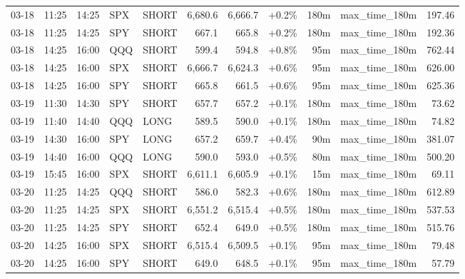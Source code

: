 \documentclass[11pt,a4paper,twoside]{article}
\begin{document}
\begin{center}
\begin{longtable}{>{\color{txtmain}}l l l l l r r r r >{\color{txtmain}}l r}
03-18 & 11:25 & 14:25 & SPX & SHORT & 6,680.6 & 6,666.7 & \textcolor{wingreen}{+0.2\%} & 180m & max\_time\_180m & \textcolor{wingreen}{197.46} \\
03-18 & 11:25 & 14:25 & SPY & SHORT & 667.1 & 665.8 & \textcolor{wingreen}{+0.2\%} & 180m & max\_time\_180m & \textcolor{wingreen}{192.36} \\
03-18 & 14:25 & 16:00 & QQQ & SHORT & 599.4 & 594.8 & \textcolor{wingreen}{+0.8\%} & 95m & max\_time\_180m & \textcolor{wingreen}{762.44} \\
03-18 & 14:25 & 16:00 & SPX & SHORT & 6,666.7 & 6,624.3 & \textcolor{wingreen}{+0.6\%} & 95m & max\_time\_180m & \textcolor{wingreen}{626.00} \\
03-18 & 14:25 & 16:00 & SPY & SHORT & 665.8 & 661.5 & \textcolor{wingreen}{+0.6\%} & 95m & max\_time\_180m & \textcolor{wingreen}{625.36} \\
03-19 & 11:30 & 14:30 & SPY & SHORT & 657.7 & 657.2 & \textcolor{wingreen}{+0.1\%} & 180m & max\_time\_180m & \textcolor{wingreen}{73.62} \\
03-19 & 11:40 & 14:40 & QQQ & LONG & 589.5 & 590.0 & \textcolor{wingreen}{+0.1\%} & 180m & max\_time\_180m & \textcolor{wingreen}{74.82} \\
03-19 & 14:30 & 16:00 & SPY & LONG & 657.2 & 659.7 & \textcolor{wingreen}{+0.4\%} & 90m & max\_time\_180m & \textcolor{wingreen}{381.07} \\
03-19 & 14:40 & 16:00 & QQQ & LONG & 590.0 & 593.0 & \textcolor{wingreen}{+0.5\%} & 80m & max\_time\_180m & \textcolor{wingreen}{500.20} \\
03-19 & 15:45 & 16:00 & SPX & SHORT & 6,611.1 & 6,605.9 & \textcolor{wingreen}{+0.1\%} & 15m & max\_time\_180m & \textcolor{wingreen}{69.11} \\
03-20 & 11:25 & 14:25 & QQQ & SHORT & 586.0 & 582.3 & \textcolor{wingreen}{+0.6\%} & 180m & max\_time\_180m & \textcolor{wingreen}{612.89} \\
03-20 & 11:25 & 14:25 & SPX & SHORT & 6,551.2 & 6,515.4 & \textcolor{wingreen}{+0.5\%} & 180m & max\_time\_180m & \textcolor{wingreen}{537.53} \\
03-20 & 11:25 & 14:25 & SPY & SHORT & 652.4 & 649.0 & \textcolor{wingreen}{+0.5\%} & 180m & max\_time\_180m & \textcolor{wingreen}{515.76} \\
03-20 & 14:25 & 16:00 & SPX & SHORT & 6,515.4 & 6,509.5 & \textcolor{wingreen}{+0.1\%} & 95m & max\_time\_180m & \textcolor{wingreen}{79.48} \\
03-20 & 14:25 & 16:00 & SPY & SHORT & 649.0 & 648.5 & \textcolor{wingreen}{+0.1\%} & 95m & max\_time\_180m & \textcolor{wingreen}{57.79} \\

\end{longtable}
\end{center}
\end{document}
